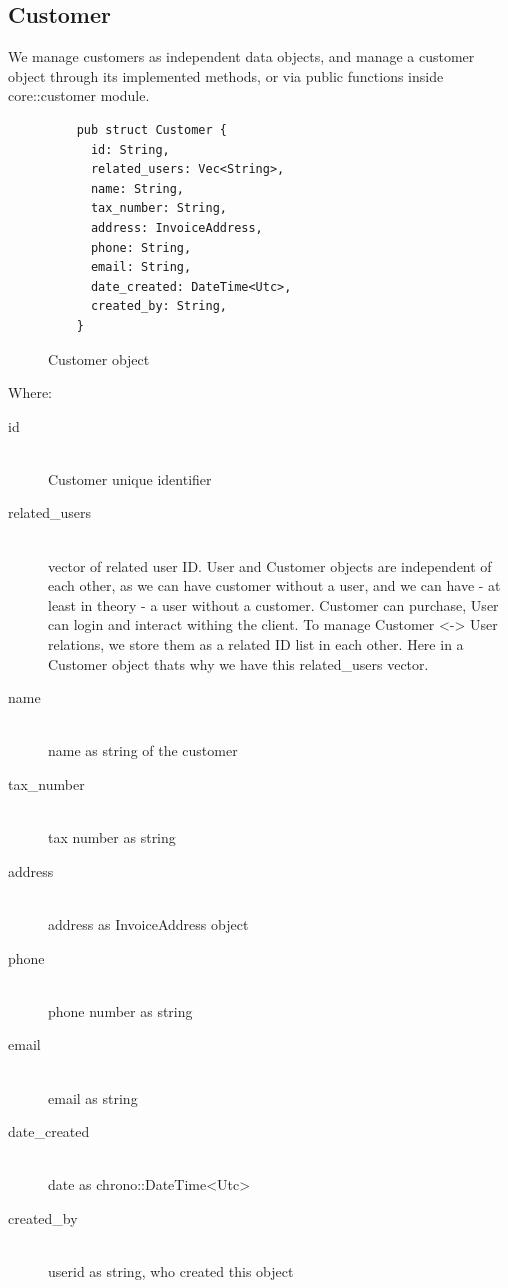\documentclass{article}
\begin{document}
\subsection{Customer}

We manage customers as independent data objects, and manage a customer
object through its implemented methods, or via public functions inside
core::customer module.

\begin{figure}[!htb]
  \caption{Customer object}
  \begin{verbatim}
    pub struct Customer {
      id: String,
      related_users: Vec<String>,
      name: String,
      tax_number: String,
      address: InvoiceAddress,
      phone: String,
      email: String,
      date_created: DateTime<Utc>,
      created_by: String,
    }
  \end{verbatim}
\end{figure}

Where:

\begin{description}
  \item[id] \hfill
    \\ Customer unique identifier 
  \item[related\_users] \hfill
    \\ vector of related user ID. User and Customer objects are independent
    of each other, as we can have customer without a user, and we can have
    - at least in theory - a user without a customer. Customer can
    purchase, User can login and interact withing the client. To manage
    Customer <-> User relations, we store them as a related ID list in
    each other. Here in a Customer object thats why we have this
    related\_users vector.

  \item[name] \hfill
    \\ name as string of the customer

  \item[tax\_number] \hfill
    \\ tax number as string
  \item[address] \hfill
    \\ address as InvoiceAddress object 
  \item[phone] \hfill
    \\ phone number as string
  \item[email] \hfill
    \\ email as string
  \item[date\_created] \hfill
    \\ date as chrono::DateTime<Utc>
  \item[created\_by] \hfill
    \\ userid as string, who created this object 
\end{description}
\end{document}
